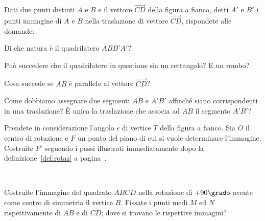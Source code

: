 \begin{esercizio}
\label{ese:8.46} %
\noindent\begin{minipage}{0.75\textwidth}\parindent15pt
Dati due punti distinti $A$ e $B$ e il vettore $\overrightarrow{CD}$ 
della figura a fianco, detti $A'$ e $B'$ i punti immagine di $A$ e 
$B$ nella traslazione di vettore $\overrightarrow{CD}$, rispondete 
alle domande:
\begin{enumeratea}
\item Di che natura è il quadrilatero $ABB'A'$?
\item Può succedere che il quadrilatero in questione sia un 
rettangolo? E un rombo?
\item Cosa succede se $AB$ è parallelo al vettore 
$\overrightarrow{CD}$?
\end{enumeratea}
\end{minipage}\hfil
\begin{minipage}{0.25\textwidth}
  \centering 
\end{minipage}\vspace{8pt}
\end{esercizio}

\begin{esercizio}
\label{ese:8.47} %
Come dobbiamo assegnare due segmenti $AB$ e $A'B'$ affinché siano 
corrispondenti in una traslazione? \`E unica la traslazione che 
associa ad $AB$ il segmento $A'B'$?
\end{esercizio}

\begin{esercizio}
\label{ese:8.58} %
\noindent\begin{minipage}{0.75\textwidth}\parindent15pt
Prendete in considerazione l'angolo $\epsilon$ di vertice $T$ della 
figura a fianco. Sia $O$ il centro di rotazione e $F$ un punto del 
piano di cui si vuole determinare l'immagine. Costruite $F'$ seguendo 
i passi illustrati immediatamente dopo la definizione~\ref{def:rotaz} 
a pagina~\pageref{def:rotaz}.
\end{minipage}\hfil
\begin{minipage}{0.3\textwidth}
  \centering~~
\end{minipage}\vspace{8pt}
\end{esercizio}

\begin{esercizio}
\label{ese:8.59} %
Costruite l'immagine del quadrato $ABCD$ nella rotazione di 
$+90\grado$ avente come centro di simmetria il vertice $B$.
Fissate i punti medi $M$ ed $N$ rispettivamente di $AB$ e di $CD$; 
dove si trovano le rispettive immagini?
\end{esercizio}

